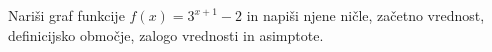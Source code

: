 \naloga[\tocke{10}]
    Nariši graf funkcije $f(x)=3^{x+1}-2$ in napiši njene ničle, začetno vrednost, definicijsko območje, zalogo vrednosti in asimptote.
    \dodatek{}